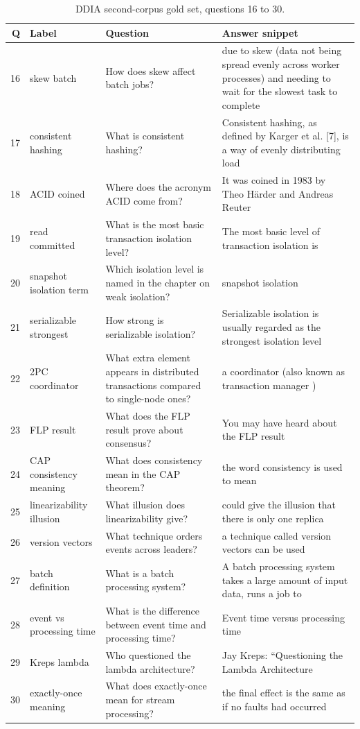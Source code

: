 \begin{table}[htbp]
\ContinuedFloat
\centering
\footnotesize
\caption{DDIA second-corpus gold set, questions 16 to 30.}
\begin{tabular}{r p{2.4cm} p{4.4cm} p{6.0cm}}
\toprule
\textbf{Q} & \textbf{Label} & \textbf{Question} & \textbf{Answer snippet} \\
\midrule
16 & skew batch & How does skew affect batch jobs? & due to skew (data not being spread evenly across worker processes) and needing to wait for the slowest task to complete \\
17 & consistent hashing & What is consistent hashing? & Consistent hashing, as defined by Karger et al. [7], is a way of evenly distributing load \\
18 & ACID coined & Where does the acronym ACID come from? & It was coined in 1983 by Theo H\"arder and Andreas Reuter \\
19 & read committed & What is the most basic transaction isolation level? & The most basic level of transaction isolation is \\
20 & snapshot isolation term & Which isolation level is named in the chapter on weak isolation? & snapshot isolation \\
21 & serializable strongest & How strong is serializable isolation? & Serializable isolation is usually regarded as the strongest isolation level \\
22 & 2PC coordinator & What extra element appears in distributed transactions compared to single-node ones? & a coordinator (also known as transaction manager ) \\
23 & FLP result & What does the FLP result prove about consensus? & You may have heard about the FLP result \\
24 & CAP consistency meaning & What does consistency mean in the CAP theorem? & the word consistency is used to mean \\
25 & linearizability illusion & What illusion does linearizability give? & could give the illusion that there is only one replica \\
26 & version vectors & What technique orders events across leaders? & a technique called version vectors can be used \\
27 & batch definition & What is a batch processing system? & A batch processing system takes a large amount of input data, runs a job to \\
28 & event vs processing time & What is the difference between event time and processing time? & Event time versus processing time \\
29 & Kreps lambda & Who questioned the lambda architecture? & Jay Kreps: ``Questioning the Lambda Architecture \\
30 & exactly-once meaning & What does exactly-once mean for stream processing? & the final effect is the same as if no faults had occurred \\
\bottomrule
\end{tabular}
\end{table}

